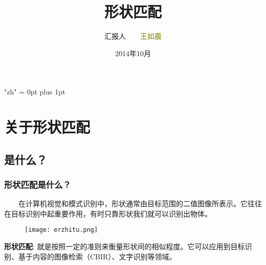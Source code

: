 \documentclass[notheorems,mathserif,table,compress]{beamer}  %
\begin{document}
\XeTeXlinebreaklocale "zh"         %
\XeTeXlinebreakskip = 0pt plus 1pt %
\begin{comment}
\AtBeginSection[]{                              %
  \frame<handout:0>{
    \frametitle{Content}\small
    \tableofcontents[current,currentsubsection]
  }
}
\AtBeginSubsection[]                            %
{
  \frame<handout:0>                             %
  {
    \frametitle{Contents}\small
    \tableofcontents[current,currentsubsection] %
  }
}
\end{comment}
\title[形状匹配]{形状匹配}
\author[wrc]{汇报人~~~~\textcolor{olive}{王如晨}}
\institute[ouc]{\small\textcolor{violet}{中国海洋大学~~~~信息科学与工程学院}}
\date{2014年10月}
\frame{ \titlepage }

\section{关于形状匹配}

\subsection{是什么？}

\begin{frame}
\frametitle{形状匹配是什么？}
  \begin{tcolorbox}[colback=red!5,colframe=blue!75!black]
   ~~~~在计算机视觉和模式识别中，形状通常由目标范围的二值图像所表示。它往往在目标识别中起重要作用，有时只靠形状我们就可以识别出物体。
   \begin{figure}[!ht]
    \centering
    \texttt{[image: erzhitu.png]}
   \end{figure} 
   {\color{blue}\textbf{形状匹配}}:
   就是按照一定的准则来衡量形状间的相似程度。它可以应用到目标识别、基于内容的图像检索（CBIR）、文字识别等领域。
  \end{tcolorbox}
\end{frame}
\end{document}
